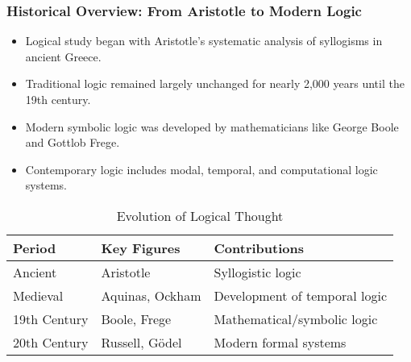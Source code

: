 \documentclass{beamer}
\begin{document}
\begin{frame}
    \frametitle{Historical Overview: From Aristotle to Modern Logic}
    \begin{itemize}
        \item Logical study began with Aristotle's systematic analysis of syllogisms in ancient Greece.
        \item Traditional logic remained largely unchanged for nearly 2,000 years until the 19th century.
        \item Modern symbolic logic was developed by mathematicians like George Boole and Gottlob Frege.
        \item Contemporary logic includes modal, temporal, and computational logic systems.
    \end{itemize}
    
    \begin{table}
        \begin{tabular}{|l|l|l|}
            \hline
            \textbf{Period} & \textbf{Key Figures} & \textbf{Contributions} \\
            \hline
            Ancient & Aristotle & Syllogistic logic \\
            \hline
            Medieval & Aquinas, Ockham & Development of temporal logic \\
            \hline
            19th Century & Boole, Frege & Mathematical/symbolic logic \\
            \hline
            20th Century & Russell, Gödel & Modern formal systems \\
            \hline
        \end{tabular}
        \caption{Evolution of Logical Thought}
    \end{table}
\end{frame}
\end{document}
